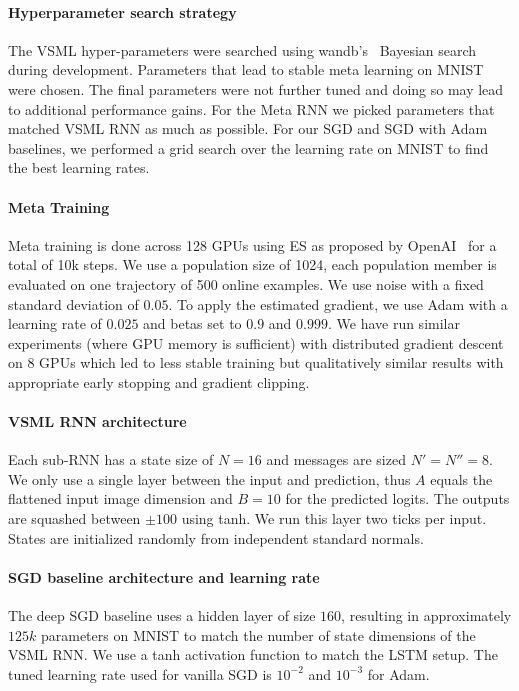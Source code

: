 \documentclass{article}
\newcommand{\principle}{VSML}
\newcommand{\sapproach}{VSML RNN}
\newcommand{\metarnn}{Meta RNN}
\begin{document}
\paragraph{Hyperparameter search strategy}
The {\principle} hyper-parameters were searched using wandb's~\citep{biewald2020} Bayesian search during development.
Parameters that lead to stable meta learning on MNIST were chosen.
The final parameters were not further tuned and doing so may lead to additional performance gains.
For the {\metarnn} we picked parameters that matched {\sapproach} as much as possible.
For our SGD and SGD with Adam baselines, we performed a grid search over the learning rate on MNIST to find the best learning rates.

\paragraph{Meta Training}
Meta training is done across 128 GPUs using ES as proposed by OpenAI~\citep{Salimans2017} for a total of 10k steps.
We use a population size of 1024, each population member is evaluated on one trajectory of 500 online examples.
We use noise with a fixed standard deviation of $0.05$.
To apply the estimated gradient, we use Adam with a learning rate of $0.025$ and betas set to $0.9$ and $0.999$.
We have run similar experiments (where GPU memory is sufficient) with distributed gradient descent on 8 GPUs which led to less stable training but qualitatively similar results with appropriate early stopping and gradient clipping.

\paragraph{{\sapproach} architecture}
Each sub-RNN has a state size of $N = 16$ and messages are sized $N' = N'' = 8$.
We only use a single layer between the input and prediction, thus $A$ equals the flattened input image dimension and $B = 10$ for the predicted logits.
The outputs are squashed between $\pm 100$ using tanh.
We run this layer two ticks per input.
States are initialized randomly from independent standard normals.

\paragraph{SGD baseline architecture and learning rate}
The deep SGD baseline uses a hidden layer of size $160$, resulting in approximately $125k$ parameters on MNIST to match the number of state dimensions of the {\sapproach}.
We use a tanh activation function to match the LSTM setup.
The tuned learning rate used for vanilla SGD is $10^{-2}$ and $10^{-3}$ for Adam.
\end{document}
